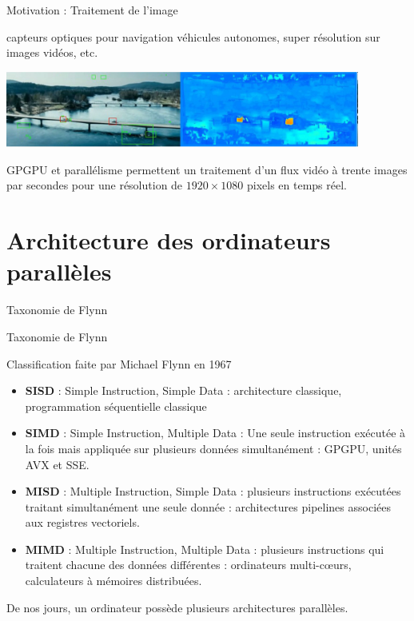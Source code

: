 \documentclass[handout]{beamer}
\begin{document}
\begin{frame}[fragile]{Motivation : Traitement de l'image}

capteurs optiques pour navigation véhicules autonomes, super résolution
sur images vidéos, etc.

\center\includegraphics[height=2.5cm]{fluxvideo}

GPGPU et parallélisme permettent un traitement d'un flux vidéo à trente images par secondes
pour une résolution de $1920\times 1080$ pixels en temps réel.

\end{frame}

\section{Architecture des ordinateurs parallèles}

\begin{frame}[fragile]{Taxonomie de Flynn}
 
\begin{block}{Taxonomie de Flynn}
 
Classification faite par Michael Flynn en 1967
\small
\begin{itemize}
\item \textbf{SISD} : Simple Instruction, Simple Data : architecture classique, programmation séquentielle
  classique
\item \textbf{SIMD} : Simple Instruction, Multiple Data : Une seule instruction exécutée à la fois mais
	        appliquée sur plusieurs données simultanément : GPGPU, unités  AVX et SSE.
\item \textbf{MISD} : Multiple Instruction, Simple Data : plusieurs instructions exécutées traitant simultanément
                une seule donnée : architectures pipelines associées aux registres vectoriels.
\item \textbf{MIMD} : Multiple Instruction, Multiple Data : plusieurs instructions qui traitent chacune des données
  différentes : ordinateurs multi-c{\oe}urs, calculateurs à mémoires distribuées.
\end{itemize}
\end{block}

De nos jours, un ordinateur possède plusieurs architectures parallèles.

\end{frame}
\end{document}
